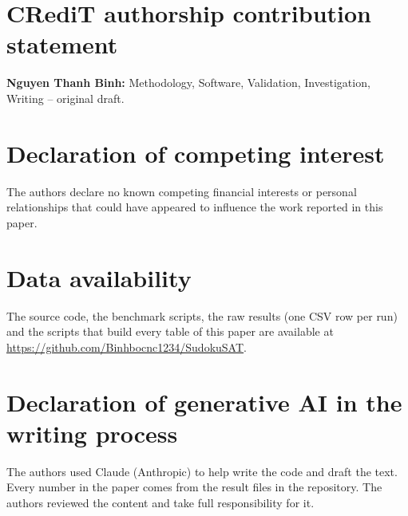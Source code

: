 \section*{CRediT authorship contribution statement}
\textbf{Nguyen Thanh Binh:} Methodology, Software, Validation, Investigation, Writing -- original draft.

\section*{Declaration of competing interest}
The authors declare no known competing financial interests or personal relationships that could have appeared to influence the work reported in this paper.

\section*{Data availability}
The source code, the benchmark scripts, the raw results (one CSV row per run) and the scripts that build every table of this paper are available at \url{https://github.com/Binhbocnc1234/SudokuSAT}.

\section*{Declaration of generative AI in the writing process}
The authors used Claude (Anthropic) to help write the code and draft the text. Every number in the paper comes from the result files in the repository. The authors reviewed the content and take full responsibility for it.

